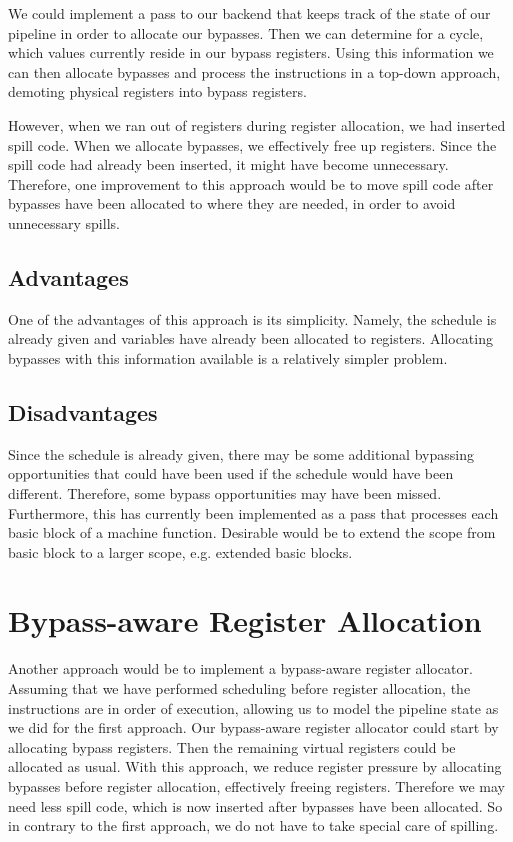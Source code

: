 We could implement a pass to our backend that keeps track of the state of our pipeline in order to allocate our bypasses. Then we can determine for a cycle, which values currently reside in our bypass registers. Using this information we can then allocate bypasses and process the instructions in a top-down approach, demoting physical registers into bypass registers.

However, when we ran out of registers during register allocation, we had inserted spill code. When we allocate bypasses, we effectively free up registers. Since the spill code had already been inserted, it might have become unnecessary. Therefore, one improvement to this approach would be to move spill code after bypasses have been allocated to where they are needed, in order to avoid unnecessary spills.

\subsection{Advantages}
One of the advantages of this approach is its simplicity. Namely, the schedule is already given and variables have already been allocated to registers. Allocating bypasses with this information available is a relatively simpler problem. 

\subsection{Disadvantages}
Since the schedule is already given, there may be some additional bypassing opportunities that could have been used if the schedule would have been different. Therefore, some bypass opportunities may have been missed. Furthermore, this has currently been implemented as a pass that processes each basic block of a machine function. Desirable would be to extend the scope from basic block to a larger scope, e.g. extended basic blocks. 

\section{Bypass-aware Register Allocation}\label{sec:ra_approach}
Another approach would be to implement a bypass-aware register allocator. Assuming that we have performed scheduling before register allocation, the instructions are in order of execution, allowing us to model the pipeline state as we did for the first approach. Our bypass-aware register allocator could start by allocating bypass registers. Then the remaining virtual registers could be allocated as usual. With this approach, we reduce register pressure by allocating bypasses before register allocation, effectively freeing registers. Therefore we may need less spill code, which is now inserted after bypasses have been allocated. So in contrary to the first approach, we do not have to take special care of spilling.

